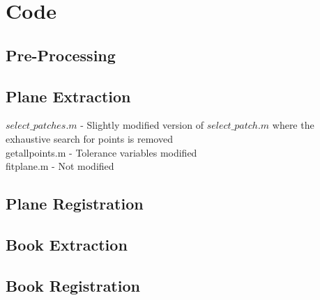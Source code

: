 \section{Code}
\subsection{Pre-Processing}
\subsection{Plane Extraction}
$select\_patches.m$ - Slightly modified version of $select\_patch.m$ where the exhaustive search for points is removed \\
getallpoints.m - Tolerance variables modified \\
fitplane.m - Not modified \\
\subsection{Plane Registration}
\subsection{Book Extraction}
\subsection{Book Registration}